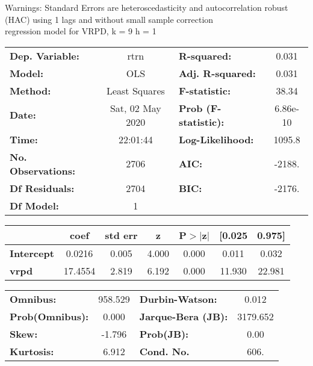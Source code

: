 Warnings: \newline
 [1] Standard Errors are heteroscedasticity and autocorrelation robust (HAC) using 1 lags and without small sample correction\\ 

regression model for VRPD, k = 9 h = 1\begin{center}
\begin{tabular}{lclc}
\toprule
\textbf{Dep. Variable:}    &       rtrn       & \textbf{  R-squared:         } &     0.031   \\
\textbf{Model:}            &       OLS        & \textbf{  Adj. R-squared:    } &     0.031   \\
\textbf{Method:}           &  Least Squares   & \textbf{  F-statistic:       } &     38.34   \\
\textbf{Date:}             & Sat, 02 May 2020 & \textbf{  Prob (F-statistic):} &  6.86e-10   \\
\textbf{Time:}             &     22:01:44     & \textbf{  Log-Likelihood:    } &    1095.8   \\
\textbf{No. Observations:} &        2706      & \textbf{  AIC:               } &    -2188.   \\
\textbf{Df Residuals:}     &        2704      & \textbf{  BIC:               } &    -2176.   \\
\textbf{Df Model:}         &           1      & \textbf{                     } &             \\
\bottomrule
\end{tabular}
\begin{tabular}{lcccccc}
                   & \textbf{coef} & \textbf{std err} & \textbf{z} & \textbf{P$> |$z$|$} & \textbf{[0.025} & \textbf{0.975]}  \\
\midrule
\textbf{Intercept} &       0.0216  &        0.005     &     4.000  &         0.000        &        0.011    &        0.032     \\
\textbf{vrpd}      &      17.4554  &        2.819     &     6.192  &         0.000        &       11.930    &       22.981     \\
\bottomrule
\end{tabular}
\begin{tabular}{lclc}
\textbf{Omnibus:}       & 958.529 & \textbf{  Durbin-Watson:     } &    0.012  \\
\textbf{Prob(Omnibus):} &   0.000 & \textbf{  Jarque-Bera (JB):  } & 3179.652  \\
\textbf{Skew:}          &  -1.796 & \textbf{  Prob(JB):          } &     0.00  \\
\textbf{Kurtosis:}      &   6.912 & \textbf{  Cond. No.          } &     606.  \\
\bottomrule
\end{tabular}
\end{center}


